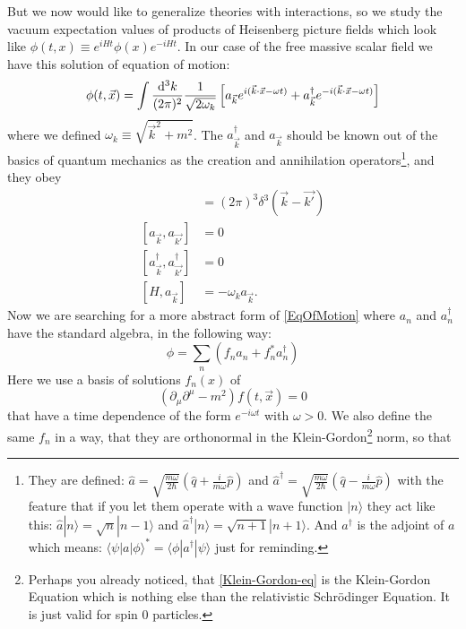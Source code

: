 	But we now would like to generalize theories with interactions, so we study the vacuum expectation values of products of Heisenberg picture fields which look like $\phi(t,x) \equiv e^{iHt} \phi(x) e^{-iHt}$. In our case of the free massive scalar field we have this solution of equation of motion:
		\begin{equation}  \label{EqOfMotion}
			\phi(t,\vec{x}) = \int \frac{\mathrm{d}^3 k}{(2\pi)^2} \frac{1}{\sqrt{2\omega_k}} 
			\left[ a_{\vec{k}} e^{i(\vec{k}\cdot\vec{x}-\omega t)} +
			a^{\dagger}_{\vec{k}} e^{-i(\vec{k}\cdot\vec{x}-\omega t)}
			\right]
		\end{equation}
	where we defined $\omega_k \equiv \sqrt{\vec{k}^2+m^2}$. The $a^{\dagger}_{\vec{k}}$ and $a_{\vec{k}}$ should be known out of the basics of quantum mechanics as the creation and annihilation operators\footnote{They are defined: $\hat{a}= \sqrt{\frac{m\omega}{2\hbar}} 
		\left(\hat{q} + \frac{i}{m\omega}\hat{p}
		\right)
		$ and 
		$ \hat{a}^{\dagger}= \sqrt{\frac{m\omega}{2\hbar}} 
		\left(\hat{q} - \frac{i}{m\omega}\hat{p}
		\right)
		$
	with the feature that if you let them operate with a wave function $|n\rangle$ they act like this:
	$\hat{a}|n\rangle = \sqrt{n}|n-1\rangle$ and $\hat{a}^{\dagger}|n\rangle= \sqrt{n+1}|n+1\rangle$.
	And $a^{\dagger}$ is the adjoint of $a$ which means: $\langle \psi | a | \phi \rangle^*= \langle \phi | a^{\dagger} | \psi \rangle$ just for reminding.
	}, and they obey
		\begin{align*}
			[a_{\vec{k}},a^{\dagger}_{\vec{k'}}]&= (2\pi)^3 \delta^3 (\vec{k}-\vec{k'})\\
			[a_{\vec{k}},a_{\vec{k'}}]&=0 \\
			[a^{\dagger}_{\vec{k}},a^{\dagger}_{\vec{k'}}]&=0 \\
			[H,a_{\vec{k}}]&=-\omega_k a_{\vec{k}}.
		\end{align*}
	Now we are searching for a more abstract form of \eqref{EqOfMotion} where $a_n$ and $a^{\dagger}_n$ have the standard algebra, in the following way:
		\begin{equation} \label{wave_fct}
			\phi = \sum_n \left(f_n a_n + f^*_n a^{\dagger}_n \right)
		\end{equation}
	Here we use a basis of solutions $f_n(x)$ of
		\begin{equation} \label{Klein-Gordon-eq}
			\left( \partial_{\mu}\partial^{\mu} - m^2 \right) f(t,\vec{x})=0
		\end{equation}			
	that have a time dependence of the form $e^{-i\omega t}$ with $\omega>0$. We also define the same $f_n$ in a way, that they are orthonormal in the Klein-Gordon\footnote{Perhaps you already noticed, that \eqref{Klein-Gordon-eq} is the Klein-Gordon Equation which is nothing else than the relativistic Schrödinger Equation. It is just valid for spin 0 particles.} norm, so that

